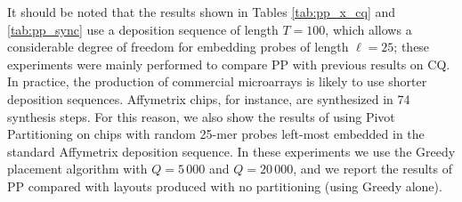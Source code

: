 It should be noted that the results shown in Tables \ref{tab:pp_x_cq} and
\ref{tab:pp_sync} use a deposition sequence of length $T=100$, which allows a
considerable degree of freedom for embedding probes of length $\ell=25$; these
experiments were mainly performed to compare PP with previous results on CQ. In
practice, the production of commercial microarrays is likely to use shorter
deposition sequences. Affymetrix chips, for instance, are synthesized in 74
synthesis steps. For this reason, we also show the results of using Pivot
Partitioning on chips with random 25-mer probes left-most embedded in the
standard Affymetrix deposition sequence. In these experiments we use the Greedy
placement algorithm with $Q=5\,000$ and $Q=20\,000$, and we report the results
of PP compared with layouts produced with no partitioning (using Greedy alone).

